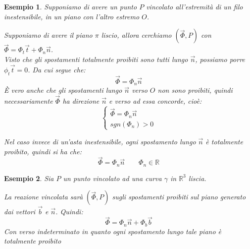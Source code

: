 \documentclass[11pt,a4paper,twoside]{article}
\newtheorem{es}{Esempio}
\theoremstyle{definition}
\begin{document}
\begin{es}
	Supponiamo di avere un punto $P$ vincolato all'estremità di un filo inestensibile, in un piano con l'altro estremo $O$.
	\begin{center}
	\end{center}
	Supponiamo di avere il piano $\pi$ liscio, allora cerchiamo $(\vec\Phi, P)$ con $\vec\Phi = \Phi_t \vec t + \Phi_n \vec n$.\\
	Visto che gli spostamenti totalmente proibiti sono tutti lungo $\vec n$, possiamo porre $\phi_t \vec t = 0$. Da cui segue che:
	\[\vec \Phi = \Phi_n \vec n \]
È vero anche che gli spostamenti lungo $\vec n$ verso $O$ non sono proibiti, quindi necessariamente $\vec\Phi$ ha direzione $\vec n$ e verso ad essa concorde, cioè:
	\[ \begin{cases} \vec\Phi = \Phi_n \vec n\\ sgn(\Phi_n)>0 \end{cases} \]

	Nel caso invece di un'asta inestensibile, ogni spostamento lungo $\vec n$ è totalmente proibito, quindi si ha che:
	\[ \vec\Phi = \Phi_n \vec n \qquad \Phi_n \in \mathbb R \]
\end{es}

\begin{es}
	Sia $P$ un punto vincolato ad una curva $\gamma$ in $\mathbb R^3$ liscia.
	\begin{center}
	\end{center}
	La reazione vincolata sarà $(\vec\Phi, P)$ sugli spostamenti proibiti sul piano generato dai vettori $\vec b$ e $\vec n$. Quindi:
	\[ \vec\Phi = \Phi_n \vec n + \Phi_b \vec b \]
	Con verso indeterminato in quanto ogni spostamento lungo tale piano è totalmente proibito
\end{es}
\end{document}
